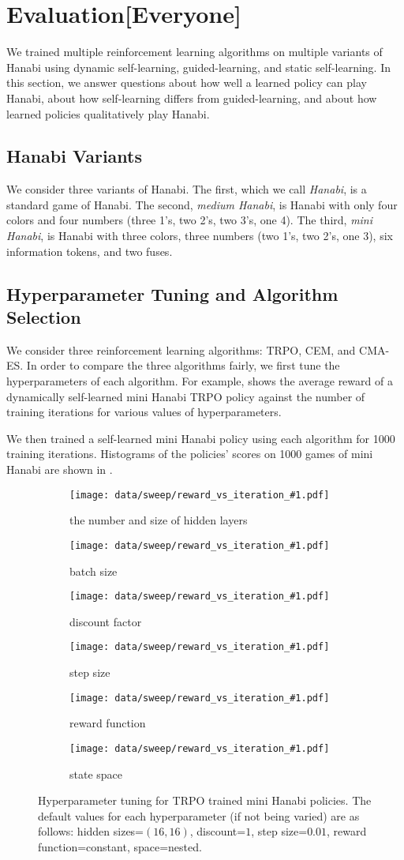 \section{Evaluation[Everyone]}\label{sec:eval}

We trained multiple reinforcement learning algorithms on multiple variants of
Hanabi using dynamic self-learning, guided-learning, and static self-learning.
In this section, we answer questions about how well a learned policy can play
Hanabi, about how self-learning differs from guided-learning, and about how
learned policies qualitatively play Hanabi.

\subsection{Hanabi Variants}
We consider three variants of Hanabi. The first, which we call \emph{Hanabi},
is a standard game of Hanabi. The second, \emph{medium Hanabi}, is Hanabi with
only four colors and four numbers (three 1's, two 2's, two 3's, one 4). The
third, \emph{mini Hanabi}, is Hanabi with three colors, three numbers (two 1's,
two 2's, one 3), six information tokens, and two fuses.

\subsection{Hyperparameter Tuning and Algorithm Selection}
We consider three reinforcement learning algorithms: TRPO, CEM, and CMA-ES. In
order to compare the three algorithms fairly, we first tune the hyperparameters
of each algorithm. For example,  shows the average reward
of a dynamically self-learned mini Hanabi TRPO policy against the number of
training iterations for various values of hyperparameters.

We then trained a self-learned mini Hanabi policy using each algorithm for 1000
training iterations. Histograms of the policies' scores on 1000 games of mini
Hanabi are shown in .

\begin{figure}[ht]
  \newcommand{\hyperparamsubfig}[3]{%
    \begin{subfigure}[t]{0.32\textwidth}
      \centering
      \texttt{[image: data/sweep/reward\_vs\_iteration\_\#1.pdf]}
      \caption{#2}\label{fig:#3}
    \end{subfigure}
  }

  \centering

  \hyperparamsubfig{hidden_sizes}{the number and size of hidden layers}{}
  \hyperparamsubfig{batch_size}{batch size}{}
  \hyperparamsubfig{discount}{discount factor}{}

  \hyperparamsubfig{step_size}{step size}{}
  \hyperparamsubfig{reward}{reward function}{}
  \hyperparamsubfig{space}{state space}{}

  \caption{
    Hyperparameter tuning for TRPO trained mini Hanabi policies. The default
    values for each hyperparameter (if not being varied) are as follows: hidden
    sizes=$(16, 16)$, discount=$1$, step size=$0.01$, reward function=constant,
    space=nested.
  }\label{fig:trpo-tuning}
\end{figure}

